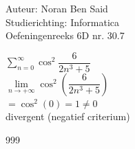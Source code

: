 \documentclass[a4paper]{article}
\begin{document}
  
\noindent \large Auteur: Noran Ben Said \\
\noindent \large Studierichting: Informatica\\
\noindent \large Oefeningenreeks 6D nr. 30.7\\

\medskip

\normalsize

$\displaystyle\sum\limits_{n=0}^{\infty} \cos^2 \dfrac{6}{2n^3 + 5} $ \\

$\lim\limits_{n \to +\infty} \cos^2\left( \dfrac{6}{2n^3 + 5} \right)$ \\

$= \cos^2(0) = 1 \neq 0$ \\

divergent (negatief criterium) \\

\begin{thebibliography}{999}
\end{thebibliography}
\end{document}
